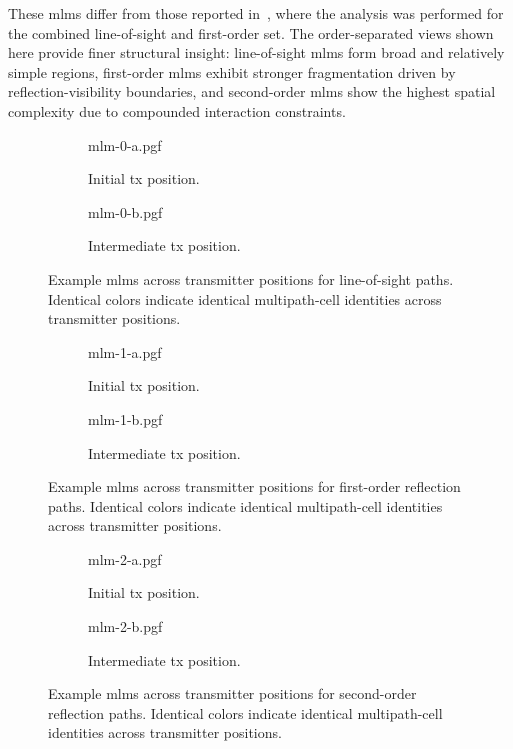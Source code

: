 These \glspl{mlm} differ from those reported in~, where the analysis was performed for the combined \gls{line-of-sight} and first-order set. The order-separated views shown here provide finer structural insight: \gls{line-of-sight} \glspl{mlm} form broad and relatively simple regions, first-order \glspl{mlm} exhibit stronger fragmentation driven by reflection-visibility boundaries, and second-order \glspl{mlm} show the highest spatial complexity due to compounded interaction constraints.

\begin{figure}
  \centering
  \begin{subfigure}[t]{0.49\contentwidth}
    \centering
    {mlm-0-a.pgf}
    \caption{Initial \gls{tx} position.}
  \end{subfigure}
  \begin{subfigure}[t]{0.49\contentwidth}
    \centering
    {mlm-0-b.pgf}
    \caption{Intermediate \gls{tx} position.}
  \end{subfigure}
  \caption{Example \glspl{mlm} across transmitter positions for \gls{line-of-sight} paths. Identical colors indicate identical multipath-cell identities across transmitter positions.}
\end{figure}

\begin{figure}
  \centering
  \begin{subfigure}[t]{0.49\contentwidth}
    \centering
    {mlm-1-a.pgf}
    \caption{Initial \gls{tx} position.}
  \end{subfigure}
  \begin{subfigure}[t]{0.49\contentwidth}
    \centering
    {mlm-1-b.pgf}
    \caption{Intermediate \gls{tx} position.}
  \end{subfigure}
  \caption{Example \glspl{mlm} across transmitter positions for first-order reflection paths. Identical colors indicate identical multipath-cell identities across transmitter positions.}
\end{figure}

\begin{figure}
  \centering
  \begin{subfigure}[t]{0.49\contentwidth}
    \centering
    {mlm-2-a.pgf}
    \caption{Initial \gls{tx} position.}
  \end{subfigure}
  \begin{subfigure}[t]{0.49\contentwidth}
    \centering
    {mlm-2-b.pgf}
    \caption{Intermediate \gls{tx} position.}
  \end{subfigure}
  \caption{Example \glspl{mlm} across transmitter positions for second-order reflection paths. Identical colors indicate identical multipath-cell identities across transmitter positions.}
\end{figure}

